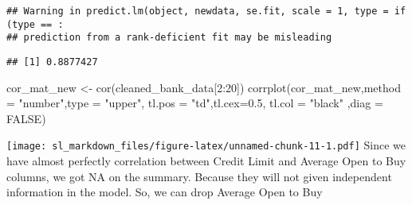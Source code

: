 \documentclass[
]{article}
\newenvironment{Shaded}{\begin{snugshade}}{\end{snugshade}}
\newcommand{\AttributeTok}[1]{\textcolor[rgb]{0.77,0.63,0.00}{#1}}
\newcommand{\ConstantTok}[1]{\textcolor[rgb]{0.00,0.00,0.00}{#1}}
\newcommand{\DecValTok}[1]{\textcolor[rgb]{0.00,0.00,0.81}{#1}}
\newcommand{\FloatTok}[1]{\textcolor[rgb]{0.00,0.00,0.81}{#1}}
\newcommand{\FunctionTok}[1]{\textcolor[rgb]{0.00,0.00,0.00}{#1}}
\newcommand{\NormalTok}[1]{#1}
\newcommand{\OtherTok}[1]{\textcolor[rgb]{0.56,0.35,0.01}{#1}}
\newcommand{\SpecialCharTok}[1]{\textcolor[rgb]{0.00,0.00,0.00}{#1}}
\newcommand{\StringTok}[1]{\textcolor[rgb]{0.31,0.60,0.02}{#1}}
\begin{document}
\begin{verbatim}
## Warning in predict.lm(object, newdata, se.fit, scale = 1, type = if (type == :
## prediction from a rank-deficient fit may be misleading
\end{verbatim}

\begin{Shaded}
\end{Shaded}

\begin{verbatim}
## [1] 0.8877427
\end{verbatim}

\begin{Shaded}
\begin{Highlighting}[]
\NormalTok{cor\_mat\_new }\OtherTok{\textless{}{-}} \FunctionTok{cor}\NormalTok{(cleaned\_bank\_data[}\DecValTok{2}\SpecialCharTok{:}\DecValTok{20}\NormalTok{])}
\FunctionTok{corrplot}\NormalTok{(cor\_mat\_new,}\AttributeTok{method =} \StringTok{"number"}\NormalTok{,}\AttributeTok{type =} \StringTok{"upper"}\NormalTok{, }\AttributeTok{tl.pos =} \StringTok{"td"}\NormalTok{,}\AttributeTok{tl.cex=}\FloatTok{0.5}\NormalTok{, }\AttributeTok{tl.col =} \StringTok{"black"}\NormalTok{ ,}\AttributeTok{diag =} \ConstantTok{FALSE}\NormalTok{)}
\end{Highlighting}
\end{Shaded}

\texttt{[image: sl\_markdown\_files/figure-latex/unnamed-chunk-11-1.pdf]}
Since we have almost perfectly correlation between Credit Limit and
Average Open to Buy columns, we got NA on the summary. Because they will
not given independent information in the model. So, we can drop Average
Open to Buy
\end{document}
